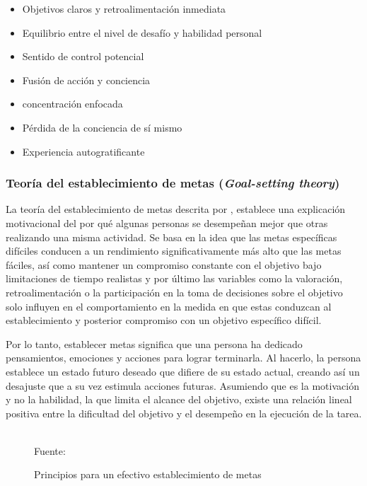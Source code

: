 \begin{itemize}
	\item Objetivos claros y retroalimentación inmediata
	\item Equilibrio entre el nivel de desafío y habilidad personal
	\item Sentido de control potencial
	\item Fusión de acción y conciencia
	\item concentración enfocada
	\item Pérdida de la conciencia de sí mismo
	\item Experiencia autogratificante
\end{itemize}

\subsubsection{Teoría del establecimiento de metas (\textit{Goal-setting theory})}

La teoría del establecimiento de metas descrita por , establece una explicación motivacional
del por qué algunas personas se desempeñan mejor que otras realizando una misma actividad. Se basa en la idea
que las metas específicas difíciles conducen a un rendimiento significativamente más alto que las metas 
fáciles, así como mantener un compromiso constante con el objetivo bajo limitaciones de tiempo realistas y por
último las variables como la valoración, retroalimentación o la participación en la toma de decisiones sobre 
el objetivo solo influyen en el comportamiento en la medida en que estas conduzcan al establecimiento y 
posterior compromiso con un objetivo específico difícil.

Por lo tanto, establecer metas significa que una persona ha dedicado pensamientos, emociones y acciones para 
lograr terminarla. Al hacerlo, la persona establece un estado futuro deseado que difiere de su estado actual, 
creando así un desajuste que a su vez estimula acciones futuras. Asumiendo que es la motivación y no la 
habilidad, la que limita el alcance del objetivo, existe una relación lineal positiva entre la dificultad del 
objetivo y el desempeño en la ejecución de la tarea.

\begin{figure}[ht]
\caption{Principios para un efectivo establecimiento de metas}
\label{img:goal}
\centering

\\
{\footnotesize Fuente: \citeA<basada en>{Locke1968}}
\end{figure}

